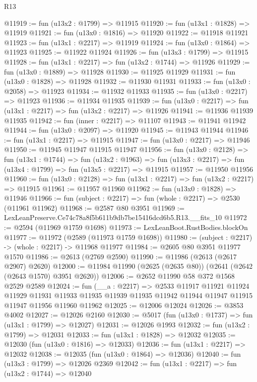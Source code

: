 \begin{lexlean}{R13}
\begin{coremodule}
@11919 := fun (u13x2 : @1799) => @11915
@11920 := fun (u13x1 : @1828) => @11919
@11921 := fun (u13x0 : @1816) => @11920
@11922 := @11918 @11921
@11923 := fun (u13x1 : @2217) => @11919
@11924 := fun (u13x0 : @1864) => @11923
@11925 := @11922 @11924
@11926 := fun (u13x3 : @1799) => @11915
@11928 := fun (u13x1 : @2217) => fun (u13x2 : @1744) => @11926
@11929 := fun (u13x0 : @1889) => @11928
@11930 := @11925 @11929
@11931 := fun (u13x0 : @1828) => @11928
@11932 := @11930 @11931
@11933 := fun (u13x0 : @2058) => @11923
@11934 := @11932 @11933
@11935 := fun (u13x0 : @2217) => @11923
@11936 := @11934 @11935
@11939 := fun (u13x0 : @2217) => fun (u13x1 : @2217) => fun (u13x2 : @2217) => @11926
@11941 := @11936 @11939 @11935
@11942 := fun (inner : @2217) => @11107
@11943 := @11941 @11942
@11944 := fun (u13x0 : @2097) => @11920
@11945 := @11943 @11944
@11946 := fun (u13x1 : @2217) => @11915
@11947 := fun (u13x0 : @2217) => @11946
@11950 := @11945 @11947 @11915 @11947
@11956 := fun (u13x0 : @2128) =>
  fun (u13x1 : @1744) =>
  fun (u13x2 : @1963) => fun (u13x3 : @2217) => fun (u13x4 : @1799) => fun (u13x5 : @2217) => @11915
@11957 := @11950 @11956
@11960 := fun (u13x0 : @2128) => fun (u13x1 : @2217) => fun (u13x2 : @2217) => @11915
@11961 := @11957 @11960
@11962 := fun (u13x0 : @1828) => @11946
@11966 := fun (subject : @2217) => fun (whole : @2217) => @2530 (@11961 @11962)
@11968 := @2587 @80 @3951
@11969 := LexLeanPreserve.Ce74c78a8f5b611b9db7be15416dcd6b5.R13.__fits_10
@11972 := @2594 (@11969 @1759 @1698)
@11973 := LexLeanBoot.RustBodies.blockOn
@11977 := @11972 (@2589 (@11973 @1759 @1698))
@11980 := (subject : @2217) -> (whole : @2217) -> @11968 @11977
@11984 := @2605 @80 @3951 @11977 @1570
@11986 := @2613 (@2769 @2590)
@11990 := @11986 (@2613 (@2617 @2907) @2620)
@12000 := @11984 @11990 (@2625 (@2635 @80)) (@2641 (@2642 (@2643 @1570) @3951 @2620))
@12006 := @2652 @11990 @58 @372 @1568 @2529 @2589
@12024 := fun (__a : @2217) =>
  @2533
    @11917
    @11921
    @11924
    @11929
    @11931
    @11933
    @11935
    @11939
    @11935
    @11942
    @11944
    @11947
    @11915
    @11947
    @11956
    @11960
    @11962
@12025 := @12006 @12024
@12026 := @3853 @4002
@12027 := @12026 @2160
@12030 := @5017 (fun (u13x0 : @1737) => fun (u13x1 : @1799) => @12027)
@12031 := @12026 @1993
@12032 := fun (u13x2 : @1799) => @12031
@12033 := fun (u13x1 : @1828) => @12032
@12035 := @12030 (fun (u13x0 : @1816) => @12033)
@12036 := fun (u13x1 : @2217) => @12032
@12038 := @12035 (fun (u13x0 : @1864) => @12036)
@12040 := fun (u13x3 : @1799) => @12026 @2369
@12042 := fun (u13x1 : @2217) => fun (u13x2 : @1744) => @12040

\end{coremodule}
\end{lexlean}
